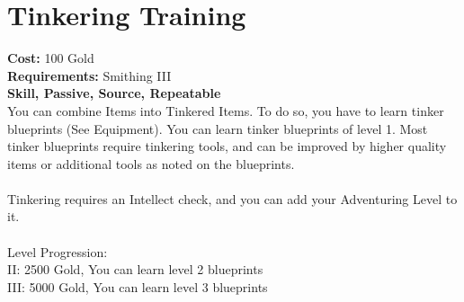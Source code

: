 \section{Tinkering Training}
\textbf{Cost:} 100 Gold\\
\textbf{Requirements:} Smithing III\\
\textbf{Skill, Passive, Source, Repeatable}\\
You can combine Items into Tinkered Items. To do so, you have to learn tinker blueprints (See Equipment). You can learn tinker blueprints of level 1. Most tinker blueprints require tinkering tools, and can be improved by higher quality items or additional tools as noted on the blueprints.\\
\\
Tinkering requires an Intellect check, and you can add your Adventuring Level to it.\\
\\
Level Progression:\\
II: 2500 Gold, You can learn level 2 blueprints\\
III: 5000 Gold, You can learn level 3 blueprints\\